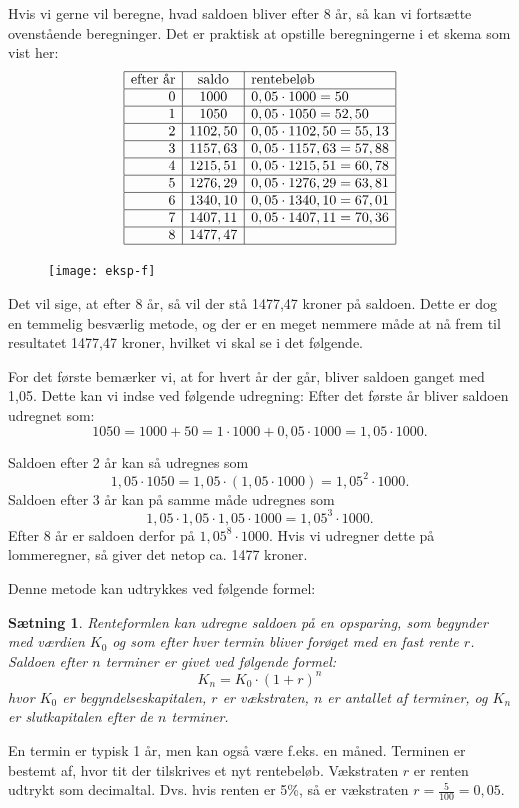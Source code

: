 \documentclass[12pt,oneside,a4paper]{article}
\newtheorem{thm}{Sætning}[section]
\begin{document}
Hvis vi gerne vil beregne, hvad saldoen bliver efter 8 år, så kan vi fortsætte
ovenstående beregninger. Det er praktisk at opstille beregningerne i et skema
som vist her:
$$
\begin{array}{|r|c|l|}
    \hline
    \mbox{efter år} & \mbox{saldo} & \mbox{rentebeløb} \\
    \hline
0 & 1000 & 0,05\cdot 1000 = 50 \\
    \hline
1 & 1050 & 0,05\cdot 1050 = 52,50 \\
    \hline
2 & 1102,50 & 0,05\cdot 1102,50 = 55,13 \\
    \hline
3 & 1157,63 & 0,05\cdot 1157,63 = 57,88 \\
    \hline
4 & 1215,51 & 0,05\cdot 1215,51 = 60,78 \\
    \hline
5 & 1276,29 & 0,05\cdot 1276,29 = 63,81 \\
    \hline
6 & 1340,10 & 0,05\cdot 1340,10 = 67,01 \\
    \hline
7 & 1407,11 & 0,05\cdot 1407,11 = 70,36 \\
    \hline
8 & 1477,47 & \\
\hline
\end{array}
$$
\begin{figure}[ht]
    \centering
    \texttt{[image: eksp-f]}
    \label{eksp-f}
\end{figure}
Det vil sige, at efter 8 år, så vil der stå 1477,47 kroner på saldoen.  Dette
er dog en temmelig besværlig metode, og der er en meget nemmere måde at nå frem
til resultatet 1477,47 kroner, hvilket vi skal se i det følgende.

For det første bemærker vi, at for hvert år der går, bliver saldoen ganget med
1,05. Dette kan vi indse ved følgende udregning: Efter det første år bliver
saldoen udregnet som:
$$
1050 = 1000 + 50 = 1\cdot 1000 + 0,05\cdot 1000 = 1,05 \cdot 1000.
$$

Saldoen efter 2 år kan så udregnes som
$$
1,05\cdot 1050 = 1,05 \cdot (1,05 \cdot 1000) = 1,05^2 \cdot 1000.
$$
Saldoen efter 3 år kan på samme måde udregnes som
$$
1,05\cdot1,05\cdot1,05\cdot 1000 = 1,05^3 \cdot 1000.
$$
Efter 8 år er saldoen
derfor på $1,05^8\cdot 1000$. Hvis vi udregner dette på lommeregner, så giver
det netop ca. 1477 kroner.

Denne metode kan udtrykkes ved følgende formel:
\begin{thm}
    {\em Renteformlen} kan udregne saldoen på en opsparing, som begynder med
    værdien $K_0$ og som efter hver {\em termin} bliver forøget med en fast
    rente $r$. Saldoen efter $n$ terminer er givet ved følgende formel:
    $$
    K_n = K_0 \cdot (1+r)^n
    $$
    hvor $K_0$ er {\em begyndelseskapitalen}, $r$ er {\em vækstraten}, $n$ er antallet af
    terminer, og $K_n$ er {\em slutkapitalen} efter de $n$ terminer.
\end{thm}
En termin er typisk 1 år, men kan også være f.eks. en måned. Terminen er bestemt af,
hvor tit der tilskrives et nyt rentebeløb. Vækstraten $r$ er renten udtrykt som
decimaltal. Dvs. hvis renten er 5\%, så er vækstraten $r=\frac{5}{100}=0,05$.
\end{document}
